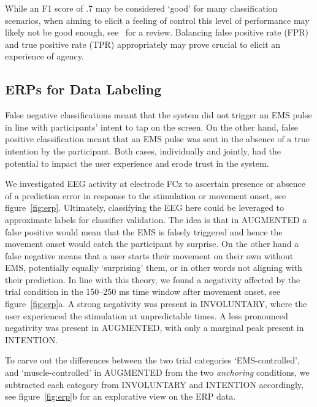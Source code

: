While an F1 score of .7 may be considered `good' for many classification scenarios, when aiming to elicit a feeling of control this level of performance may likely not be good enough, see~\citet{Papenmeier2022-oi} for a review. Balancing false positive rate (FPR) and true positive rate (TPR) appropriately may prove crucial to elicit an experience of agency.

\subsection{ERPs for Data Labeling}
False negative classifications meant that the system did not trigger an EMS pulse in line with participants' intent to tap on the screen. On the other hand, false positive classification meant that an EMS pulse was sent in the absence of a true intention by the participant. Both cases, individually and jointly, had the potential to impact the user experience and erode trust in the system. 

We investigated EEG activity at electrode FCz to ascertain presence or absence of a prediction error in response to the stimulation or movement onset, see figure~\ref{fig:erp}. Ultimately, classifying the EEG here could be leveraged to approximate labels for classifier validation. The idea is that in AUGMENTED a false positive would mean that the EMS is falsely triggered and hence the movement onset would catch the participant by surprise. On the other hand a false negative means that a user starts their movement on their own without EMS, potentially equally `surprising' them, or in other words not aligning with their prediction. In line with this theory, we found a negativity affected by the trial condition in the  150--250 ms time window after movement onset, see figure~\ref{fig:erp}a. A strong negativity was present in INVOLUNTARY, where the user experienced the stimulation at unpredictable times. A less pronounced negativity was present in AUGMENTED, with only a marginal peak present in INTENTION.

To carve out the differences between the two trial categories `EMS-controlled', and `muscle-controlled' in AUGMENTED from the two \textit{anchoring} conditions, we subtracted each category from INVOLUNTARY and INTENTION accordingly, see figure~\ref{fig:erp}b for an explorative view on the ERP data.

